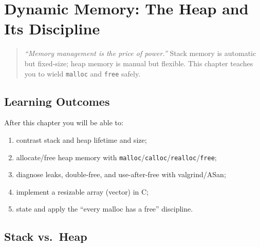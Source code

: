 \chapter{Dynamic Memory: The Heap and Its Discipline}
\label{ch:dynamic-memory}

\begin{quote}
\emph{``Memory management is the price of power.''} Stack memory is automatic but fixed-size; heap memory is manual but flexible. This chapter teaches you to wield \texttt{malloc} and \texttt{free} safely.
\end{quote}

\noindent{}

\section*{Learning Outcomes}
After this chapter you will be able to:
\begin{enumerate}[label=(L\arabic*)]
    \item contrast stack and heap lifetime and size;
    \item allocate/free heap memory with \texttt{malloc}/\texttt{calloc}/\texttt{realloc}/\texttt{free};
    \item diagnose leaks, double-free, and use-after-free with valgrind/ASan;
    \item implement a resizable array (vector) in C;
    \item state and apply the ``every malloc has a free'' discipline.
\end{enumerate}

\section{Stack vs.\ Heap}
\label{sec:stack-vs-heap}

